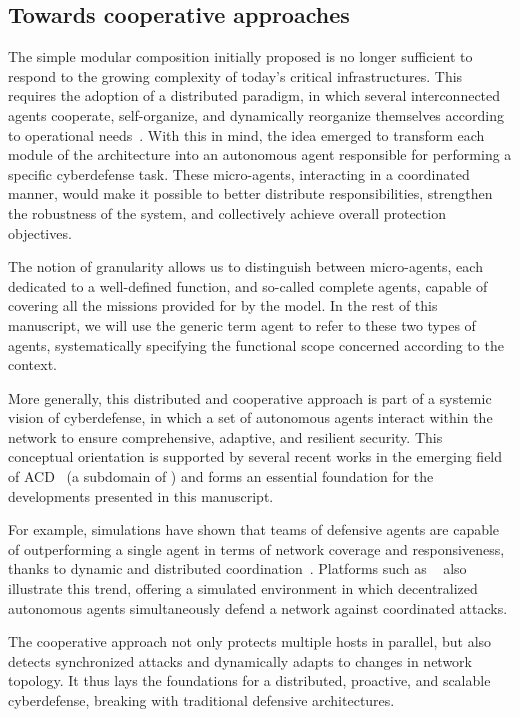 \subsection*{Towards cooperative approaches}

The simple modular composition initially proposed is no longer sufficient to respond to the growing complexity of today's critical infrastructures. This requires the adoption of a distributed paradigm, in which several interconnected agents cooperate, self-organize, and dynamically reorganize themselves according to operational needs~\cite{Ferber1999, Gleizes2008}. With this in mind, the idea emerged to transform each module of the  architecture into an autonomous agent responsible for performing a specific cyberdefense task. These micro-agents, interacting in a coordinated manner, would make it possible to better distribute responsibilities, strengthen the robustness of the system, and collectively achieve overall protection objectives.

The notion of granularity allows us to distinguish between micro-agents, each dedicated to a well-defined function, and so-called complete  agents, capable of covering all the missions provided for by the model. In the rest of this manuscript, we will use the generic term  agent to refer to these two types of agents, systematically specifying the functional scope concerned according to the context.

More generally, this distributed and cooperative approach is part of a systemic vision of cyberdefense, in which a set of autonomous agents interact within the network to ensure comprehensive, adaptive, and resilient security. This conceptual orientation is supported by several recent works in the emerging field of ACD~\cite{Vyas2023} (a subdomain of ) and forms an essential foundation for the developments presented in this manuscript.

For example, simulations have shown that teams of defensive agents are capable of outperforming a single agent in terms of network coverage and responsiveness, thanks to dynamic and distributed coordination~\cite{RLResilientCyberdefense2024}.
Platforms such as ~\cite{cage_challenge_3_announcement} also illustrate this trend, offering a simulated environment in which decentralized autonomous agents simultaneously defend a network against coordinated attacks.

The cooperative approach not only protects multiple hosts in parallel, but also detects synchronized attacks and dynamically adapts to changes in network topology. It thus lays the foundations for a distributed, proactive, and scalable cyberdefense, breaking with traditional defensive architectures.

